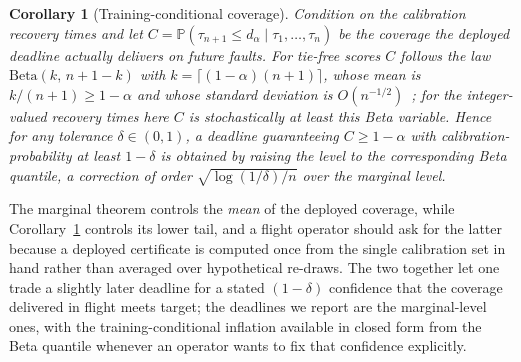 \documentclass[journal]{IEEEtran}
\theoremstyle{plain}
\newtheorem{corollary}{Corollary}
\theoremstyle{definition}
\newcommand{\Prob}{\mathbb{P}}
\newcommand{\dalpha}{d_{\alpha}}
\begin{document}
\begin{corollary}[Training-conditional coverage]
\label{cor:training}
Condition on the calibration recovery times and let
$C=\Prob(\tau_{n+1}\le\dalpha\mid \tau_1,\dots,\tau_n)$ be the coverage the deployed deadline
actually delivers on future faults. For tie-free scores $C$ follows the law
$\mathrm{Beta}(k,\,n+1-k)$ with $k=\lceil(1-\alpha)(n+1)\rceil$, whose mean is
$k/(n+1)\ge1-\alpha$ and whose standard deviation is $O(n^{-1/2})$~\cite{Vovk2012}; for the
integer-valued recovery times here $C$ is stochastically at least this Beta variable. Hence
for any tolerance $\delta\in(0,1)$, a deadline guaranteeing $C\ge1-\alpha$ with
calibration-probability at least $1-\delta$ is obtained by raising the level to the
corresponding Beta quantile, a correction of order $\sqrt{\log(1/\delta)/n}$ over the
marginal level.
\end{corollary}

The marginal theorem controls the \emph{mean} of the deployed coverage, while
Corollary~\ref{cor:training} controls its lower tail, and a flight operator should ask for
the latter because a deployed certificate is computed once from the single calibration set in
hand rather than averaged over hypothetical re-draws. The two together let one trade a
slightly later deadline for a stated $(1-\delta)$ confidence that the coverage delivered in
flight meets target; the deadlines we report are the marginal-level ones, with the
training-conditional inflation available in closed form from the Beta quantile whenever an
operator wants to fix that confidence explicitly.
\end{document}
